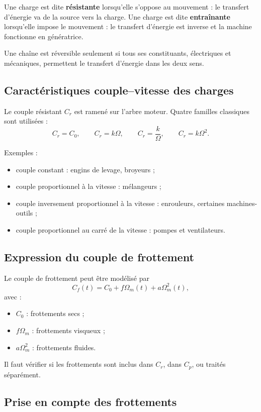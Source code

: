 Une charge est dite \textbf{résistante} lorsqu'elle s'oppose au mouvement : le transfert d'énergie va de la source vers la charge. Une charge est dite \textbf{entraînante} lorsqu'elle impose le mouvement : le transfert d'énergie est inverse et la machine fonctionne en génératrice.

Une chaîne est réversible seulement si tous ses constituants, électriques et mécaniques, permettent le transfert d'énergie dans les deux sens.

\subsection{Caractéristiques couple--vitesse des charges}

Le couple résistant $C_r$ est ramené sur l'arbre moteur. Quatre familles classiques sont utilisées :
\[
C_r=C_0,
\qquad
C_r=k\Omega,
\qquad
C_r=\frac{k}{\Omega},
\qquad
C_r=k\Omega^2.
\]

\TLCourbesCharges

Exemples :
\begin{itemize}
  \item couple constant : engins de levage, broyeurs ;
  \item couple proportionnel à la vitesse : mélangeurs ;
  \item couple inversement proportionnel à la vitesse : enrouleurs, certaines machines-outils ;
  \item couple proportionnel au carré de la vitesse : pompes et ventilateurs.
\end{itemize}

\subsection{Expression du couple de frottement}

Le couple de frottement peut être modélisé par
\[
C_f(t)=C_0+f\Omega_m(t)+a\Omega_m^2(t),
\]
avec :
\begin{itemize}
  \item $C_0$ : frottements secs ;
  \item $f\Omega_m$ : frottements visqueux ;
  \item $a\Omega_m^2$ : frottements fluides.
\end{itemize}
Il faut vérifier si les frottements sont inclus dans $C_r$, dans $C_p$, ou traités séparément.

\subsection{Prise en compte des frottements}

